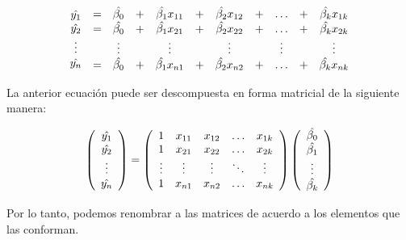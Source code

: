 \documentclass[a4paper,oneside,openany]{book}
\begin{document}
\[
\begin{equation*}
\begin{array}{c}
\hat{y_{1}} \\
\hat{y_{2}} \\
\vdots \\
\hat{y_{n}}\\
\end{array}
\begin{array}{c c c c c c c c c c}
=&\hat{\beta_{0}}&+&\hat{\beta_{1}} x_{11} &+& \hat{\beta_{2}}x_{12}&+& \ldots &+&\hat{\beta_{k}} x_{1k}\\ 
=&\hat{\beta_{0}}&+&\hat{\beta_{1}} x_{21} &+& \hat{\beta_{2}}x_{22}&+& \ldots &+&\hat{\beta_{k}} x_{2k}\\ 
&\vdots && \vdots && \vdots && \vdots && \vdots\\
=&\hat{\beta_{0}}&+&\hat{\beta_{1}} x_{n1} &+& \hat{\beta_{2}}x_{n2}&+& \ldots &+&\hat{\beta_{k}} x_{nk}\\ 
\end{array}
\end{equation*}
\]

La anterior ecuación puede ser descompuesta en forma matricial de la
siguiente manera:

\[
\begin{equation*}
\left(
\begin{array}{c}
\hat{y_{1}} \\
\hat{y_{2}} \\
\vdots \\
\hat{y_{n}}\\
\end{array}
\right)=
\left(
\begin{array}{c c c c c}
1      & x_{11} & x_{12} & \ldots & x_{1k}\\ 
1      & x_{21} & x_{22} & \ldots & x_{2k}\\
\vdots & \vdots & \vdots & \ddots & \vdots\\
1      & x_{n1} & x_{n2} & \ldots & x_{nk}\\
\end{array}
\right)
\left(
\begin{array}{c}
\hat{\beta_{0}} \\
\hat{\beta_{1}} \\
\vdots \\
\hat{\beta_{k}}\\
\end{array}
\right)
\end{equation*}
\]

Por lo tanto, podemos renombrar a las matrices de acuerdo a los
elementos que las conforman.
\end{document}
